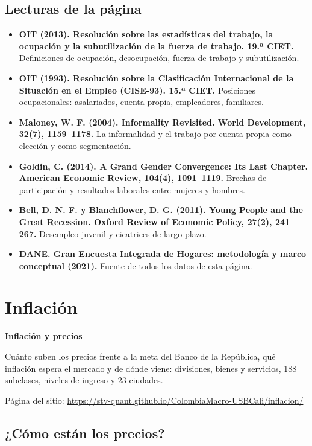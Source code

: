 \section*{Lecturas de la página}
\begin{itemize}\small
\item \textbf{OIT (2013). Resolución sobre las estadísticas del trabajo, la ocupación y la subutilización de la fuerza de trabajo. 19.ª CIET.} Definiciones de ocupación, desocupación, fuerza de trabajo y subutilización.
\item \textbf{OIT (1993). Resolución sobre la Clasificación Internacional de la Situación en el Empleo (CISE-93). 15.ª CIET.} Posiciones ocupacionales: asalariados, cuenta propia, empleadores, familiares.
\item \textbf{Maloney, W. F. (2004). Informality Revisited. World Development, 32(7), 1159–1178.} La informalidad y el trabajo por cuenta propia como elección y como segmentación.
\item \textbf{Goldin, C. (2014). A Grand Gender Convergence: Its Last Chapter. American Economic Review, 104(4), 1091–1119.} Brechas de participación y resultados laborales entre mujeres y hombres.
\item \textbf{Bell, D. N. F. y Blanchflower, D. G. (2011). Young People and the Great Recession. Oxford Review of Economic Policy, 27(2), 241–267.} Desempleo juvenil y cicatrices de largo plazo.
\item \textbf{DANE. Gran Encuesta Integrada de Hogares: metodología y marco conceptual (2021).} Fuente de todos los datos de esta página.
\end{itemize}

\chapter{Inflación}
\label{atlas:inflacion}

{\large\sffamily\bfseries Inflación y precios\par}\medskip

Cuánto suben los precios frente a la meta del Banco de la República, qué inflación espera el mercado y de dónde viene: divisiones, bienes y servicios, 188 subclases, niveles de ingreso y 23 ciudades.

{\small\color{cmmuted}Página del sitio: \url{https://stv-quant.github.io/ColombiaMacro-USBCali/inflacion/}}

\section{¿Cómo están los precios?}

